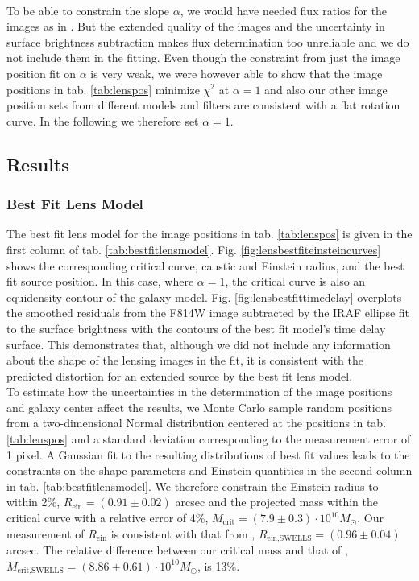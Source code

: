 \documentclass[useAMS,usenatbib]{mn2e}
\begin{document}
\\To be able to constrain the slope $\alpha$, we would have needed flux ratios for the images as in \citet{GlennEC}. But the extended quality of the images and the uncertainty in surface brightness subtraction makes flux determination too unreliable and we do not include them in the fitting. Even though the constraint from just the image position fit on $\alpha$ is very weak, we were however able to show that the image positions in tab. \ref{tab:lenspos} minimize $\chi^2$ at $\alpha=1$ and also our other image position sets from different models and filters are consistent with a flat rotation curve. In the following we therefore set $\alpha=1$.

\subsection{Results}

\subsubsection{Best Fit Lens Model}

The best fit lens model for the image positions in tab. \ref{tab:lenspos} is given in the first column of tab. \ref{tab:bestfitlensmodel}. Fig. \ref{fig:lensbestfiteinsteincurves} shows the corresponding critical curve, caustic and Einstein radius, and the best fit source position. In this case, where $\alpha=1$, the critical curve is also an equidensity contour of the galaxy model. Fig. \ref{fig:lensbestfittimedelay} overplots the smoothed residuals from the F814W image subtracted by the IRAF ellipse fit to the surface brightness with the contours of the best fit model's time delay surface. This demonstrates that, although we did not include any information about the shape of the lensing images in the fit, it is consistent with the predicted distortion for an extended source by the best fit lens model.
\\To estimate how the uncertainties in the determination of the image positions and galaxy center affect the results, we Monte Carlo sample random positions from a two-dimensional Normal distribution centered at the positions in tab. \ref{tab:lenspos} and a standard deviation corresponding to the measurement error of 1 pixel. A Gaussian fit to the resulting distributions of best fit values leads to the constraints on the shape parameters and Einstein quantities in the second column in tab. \ref{tab:bestfitlensmodel}. We therefore constrain the Einstein radius to within 2\%, $R_\text{ein} = (0.91 \pm 0.02)$ arcsec and the projected mass within the critical curve with a relative error of 4\%, $M_\text{crit} =(7.9\pm0.3)\cdot 10^{10} M_\odot$. Our measurement of $R_\text{ein}$ is consistent with that from \citet{SWELLSIII}, $R_\text{ein,SWELLS} = (0.96 \pm 0.04)$ arcsec. The relative difference between our critical mass and that of \citet{SWELLSIII}, $M_\text{crit,SWELLS} =(8.86\pm0.61)\cdot 10^{10} M_\odot$, is 13\%.
\end{document}
